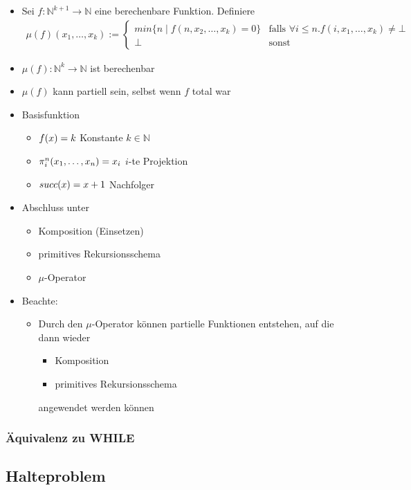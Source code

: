 \documentclass{scrartcl}
\begin{document}
\begin{itemize}
	\item Sei $f: \mathbb{N}^{k+1} \rightarrow \mathbb{N}$ eine berechenbare Funktion. Definiere
	\begin{align*}
		\mu(f)(x_1,\ldots,x_k) := \begin{cases}
			min\{ n \mid f(n,x_2,\ldots,x_k) = 0 \} & \text{falls } \forall i \leq n.f(i,x_1,\ldots,x_k) \neq \bot \\
			\bot & \text{sonst}
		\end{cases}
	\end{align*}
	\item $\mu(f): \mathbb{N}^k \rightarrow \mathbb{N}$ ist berechenbar
	\item $\mu(f)$ kann partiell sein, selbst wenn $f$ total war
	\item Basisfunktion
	\begin{itemize}
		\item $f(x) = k \hfill$ Konstante $k \in \mathbb{N}$
		\item $\pi_i^n(x_1,\ldots,x_n) = x_i \hfill$ $i$-te Projektion
		\item $succ(x) = x+1 \hfill$ Nachfolger
	\end{itemize}
	\item Abschluss unter
	\begin{itemize}
		\item Komposition (Einsetzen)
		\item primitives Rekursionsschema
		\item $\mu$-Operator
	\end{itemize}
	\item Beachte:
	\begin{itemize}
		\item Durch den $\mu$-Operator können partielle Funktionen entstehen, auf die dann wieder
		\begin{itemize}
			\item Komposition
			\item primitives Rekursionsschema
		\end{itemize}
		angewendet werden können
	\end{itemize}
\end{itemize}

\subsubsection{Äquivalenz zu WHILE}

\subsection{Halteproblem}
\end{document}
